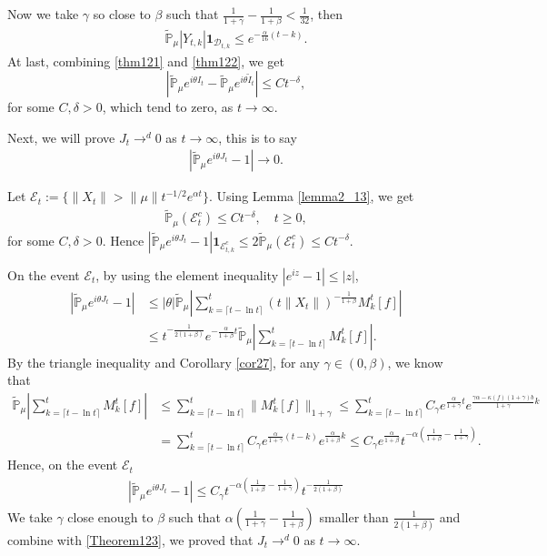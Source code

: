 \documentclass[12pt, a4paper]{amsart}
\theoremstyle{definition}
\numberwithin{equation}{section}
\begin{document}
Now we take $\gamma$ so close to $\beta$ such that $\frac{1}{1+\gamma}-\frac{1}{1+\beta}<\frac{1}{32}$, then
\begin{align}
     \mathbb{\tilde{P}}_{\mu}|Y_{t,k}|\mathbf{1}_{\mathcal{D}_{t,k}}\leq  e^{-\frac{\alpha}{16}(t-k)}.\label{thm122}
\end{align}
At last, combining \eqref{thm121} and \eqref{thm122}, we get
$$\left|\mathbb{\tilde{P}}_{\mu}e^{i\theta I_t}-\mathbb{\tilde{P}}_{\mu}e^{i\theta\tilde{I}_t}\right|\leq C t^{-\delta},$$
for some $C,\delta>0$, which tend to zero, as $t\rightarrow \infty$.

Next, we will prove $J_t \rightarrow^d 0$ as $t\rightarrow \infty$, this is to say
\begin{align*}
    \left|\mathbb{\tilde{P}}_{\mu}e^{i\theta J_t}-1\right|\rightarrow 0.
\end{align*}

Let $\mathcal{E}_t:=\{\|X_t\|>\|\mu\|t^{-1/2}e^{\alpha t}\}$. Using Lemma \ref{lemma2_13}, we get
\begin{align}
    \mathbb{\tilde{P}}_{\mu}(\mathcal{E}^c_t)\leq C t^{-\delta}, \quad t\geq0,\label{Theorem123}
\end{align}
    for some $C,\delta>0$. Hence $\left|\mathbb{\tilde{P}}_{\mu}e^{i\theta J_t}-1\right|\mathbf{1}_{\mathcal{E}^c_{t,k}}\leq 2\mathbb{\tilde{P}}_{\mu}(\mathcal{E}^c_t)\leq Ct^{-\delta}$.

On the event $\mathcal{E}_t$, by using the element inequality $|e^{i z}-1|\leq |z|$,
\begin{align*}
    \left|\mathbb{\tilde{P}}_{\mu}e^{i\theta J_t}-1\right|&\leq|\theta| \mathbb{\tilde{P}}_{\mu}\left|\sum_{k=\lceil t-\ln t \rceil}^t \left(t\|X_t\|\right)^{-\frac{1}{1+\beta}}M_k^t[f]\right|\\
    &\leq t^{-\frac{1}{2(1+\beta)}}e^{-\frac{\alpha}{1+\beta}t}\mathbb{\tilde{P}}_{\mu}\left|\sum_{k=\lceil t-\ln t \rceil}^t M_k^t[f]\right|.
\end{align*}
By the triangle inequality and Corollary \ref{cor27}, for any $\gamma\in(0,\beta)$, we know that
\begin{align*}
    \mathbb{\tilde{P}}_{\mu}\left|\sum_{k=\lceil t-\ln t \rceil}^t M_k^t[f]\right|&\leq \sum_{k=\lceil t-\ln t \rceil}^t \|M_k^t[f]\|_{1+\gamma}\leq\sum_{k=\lceil t-\ln t \rceil}^t C_{\gamma}e^{\frac{\alpha}{1+\gamma}t}e^{\frac{\gamma \alpha-\kappa(f)(1+\gamma)b}{1+\gamma}k}\\
    &=\sum_{k=\lceil t-\ln t \rceil}^t C_{\gamma}e^{\frac{\alpha}{1+\gamma}(t-k)}e^{\frac{\alpha}{1+\beta}k}\leq C_{\gamma}e^{\frac{\alpha}{1+\beta}}t^{-\alpha(\frac{1}{1+\beta}-\frac{1}{1+\gamma})}.
\end{align*}
Hence, on the event $\mathcal{E}_t$
\begin{align*}
    \left|\mathbb{\tilde{P}}_{\mu}e^{i\theta J_t}-1\right|\leq C_{\gamma}t^{-\alpha(\frac{1}{1+\beta}-\frac{1}{1+\gamma})} t^{-\frac{1}{2(1+\beta)}}
\end{align*}
We take $\gamma$ close enough to $\beta$ such that $\alpha(\frac{1}{1+\gamma}-\frac{1}{1+\beta})$ smaller than $\frac{1}{2(1+\beta)}$ and combine with \eqref{Theorem123}, we proved that $J_t \rightarrow^d 0$ as $t\rightarrow \infty$.
\end{document}
